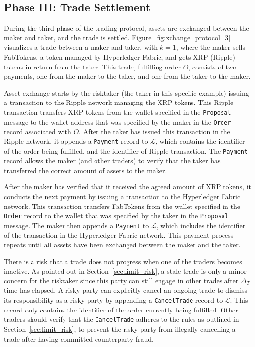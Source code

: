 \subsection*{Phase III: Trade Settlement}
\label{sec:phase_settlement}
During the third phase of the \ModelName{} trading protocol, assets are exchanged between the maker and taker, and the trade is settled.
Figure~\ref{fig:xchange_protocol_3} visualizes a trade between a maker and taker, with $ k = 1 $, where the maker sells FabTokens, a token managed by Hyperledger Fabric, and gets XRP (Ripple) tokens in return from the taker.
This trade, fulfilling order $ O $, consists of two payments, one from the maker to the taker, and one from the taker to the maker.

Asset exchange starts by the risktaker (the taker in this specific example) issuing a transaction to the Ripple network managing the XRP tokens.
This Ripple transaction transfers XRP tokens from the wallet specified in the \texttt{Proposal} message to the wallet address that was specified by the maker in the \texttt{Order} record associated with $ O $.
After the taker has issued this transaction in the Ripple network, it appends a \texttt{Payment} record to $ \mathcal{L} $, which contains the identifier of the order being fulfilled, and the identifier of Ripple transaction.
The \texttt{Payment} record allows the maker (and other traders) to verify that the taker has transferred the correct amount of assets to the maker.

After the maker has verified that it received the agreed amount of XRP tokens, it conducts the next payment by issuing a transaction to the Hyperledger Fabric network.
This transaction transfers FabTokens from the wallet specified in the \texttt{Order} record to the wallet that was specified by the taker in the \texttt{Proposal} message.
The maker then appends a \texttt{Payment} to $ \mathcal{L} $, which includes the identifier of the transaction in the Hyperledger Fabric network.
This payment process repeats until all assets have been exchanged between the maker and the taker.

There is a risk that a trade does not progress when one of the traders becomes inactive.
As pointed out in Section~\ref{sec:limit_risk}, a stale trade is only a minor concern for the risktaker since this party can still engage in other trades after $ \Delta_T $ time has elapsed.
A risky party can explicitly cancel an ongoing trade to dismiss its responsibility as a risky party by appending a \texttt{CancelTrade} record to $ \mathcal{L} $.
This record only contains the identifier of the order currently being fulfilled.
Other traders should verify that the \texttt{CancelTrade} adheres to the rules as outlined in Section~\ref{sec:limit_risk}, to prevent the risky party from illegally cancelling a trade after having committed counterparty fraud.

